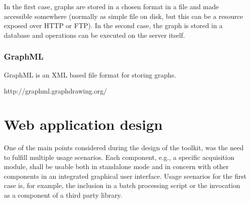 In the first case, graphs are stored in a chosen format in a file and made accessible somewhere (normally as simple file on disk, but this can be a resource exposed over HTTP or FTP). In the second case, the graph is stored in a database and operations can be executed on the server itself.

\subsubsection{GraphML} 

GraphML is an XML based file format for storing graphs.

http://graphml.graphdrawing.org/

\section{Web application design}

One of the main points considered during the design of the toolkit, was the need to fulfill multiple usage scenarios. Each component, e.g., a specific acquisition module, shall be usable both in standalone mode and in concern with other components in an integrated graphical user interface. Usage scenarios for the first case is, for example, the inclusion in a batch processing script or the invocation as a component of a third party library.
